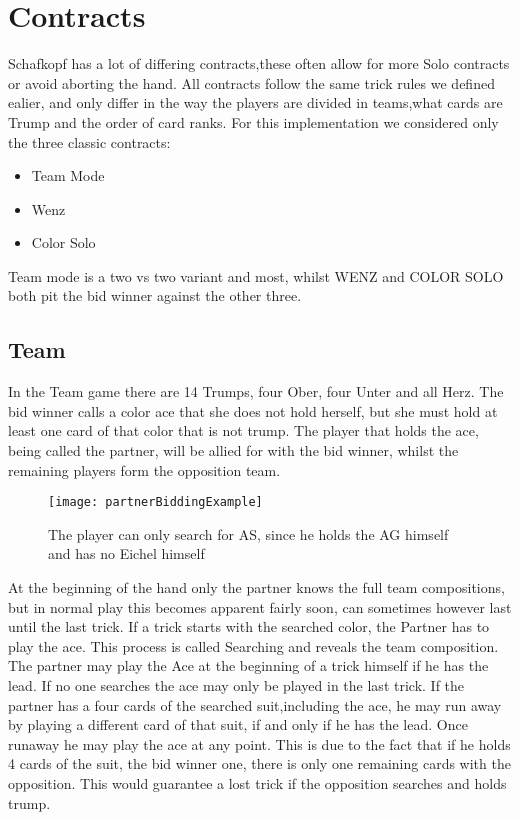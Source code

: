 \section{Contracts}
Schafkopf has a lot of differing contracts,these often allow for more Solo contracts or avoid aborting the hand.
All contracts follow the same trick rules we defined ealier, and only differ in the way the players are divided in
teams,what cards are Trump and the order of card ranks.
For this implementation we considered only the three classic contracts:
\begin{itemize}
    \item Team Mode
    \item Wenz
    \item Color Solo
\end{itemize}
Team mode is a two vs two variant and most, whilst WENZ and COLOR SOLO both pit the bid winner against the other three.

\subsection{Team}
In the Team game there are 14 Trumps, four Ober, four Unter and all Herz.
\newline
The bid winner calls a color ace that she does not hold herself, but she must hold at least one card of that color
that is not trump.
The player that holds the ace, being called the partner, will be allied for with the bid winner, whilst the remaining
players form the opposition team.
\newline
\begin{figure}
    \texttt{[image: partnerBiddingExample]}\label{fig:figure}
    \caption{The player can only search for AS, since he holds the AG himself and has no Eichel himself}
\end{figure}
At the beginning of the hand only the partner knows the full team compositions, but in normal play this becomes
apparent fairly soon, can sometimes however last until the last trick.
If a trick starts with the searched color, the Partner has to play the ace.
This process is called Searching and reveals the team composition.
The partner may play the Ace at the beginning of a trick himself if he has the lead.
If no one searches the ace may only be played in the last trick.
If the partner has a four cards of the searched suit,including the ace, he may run away by playing a different card of
that suit, if and only if he has the lead.
Once runaway he may play the ace at any point.
This is due to the fact that if he holds 4 cards of the suit, the bid winner one, there is only one remaining cards
with the opposition.
This would guarantee a lost trick if the opposition searches and holds trump.

